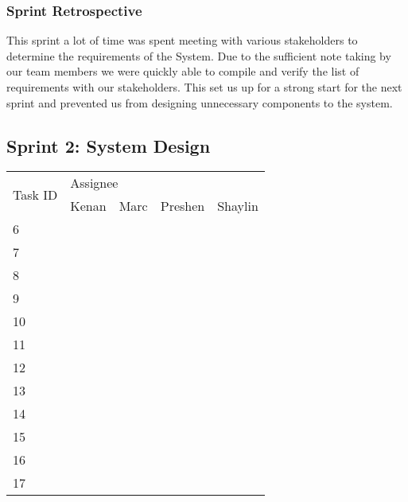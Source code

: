 \documentclass[11pt]{article}
\begin{document}
\subsubsection{Sprint Retrospective}
This sprint a lot of time was spent meeting with various stakeholders to determine the requirements of the System. Due to the sufficient note taking by our team members we were quickly able to compile and verify the list of requirements with our stakeholders. This set us up for a strong start for the next sprint and prevented us from designing unnecessary components to the system.

\subsection{Sprint 2: System Design}

\begin{table}[H]
	\begin{tabular}{@{}|l||l|l|l|l|@{}}
		\toprule
		\multirow{2}{*}{Task ID} & \multicolumn{4}{l|}{Assignee}    \\ \cmidrule(l){2-5} 
	    	& Kenan & Marc & Preshen & Shaylin \\ \midrule
		6	&   \checkmark    &      &        &        \\ \midrule
		7	&       &      &        & \checkmark       \\ \midrule
		8	&   \checkmark    &      &        &        \\ \midrule
		9	&       &  \checkmark    &        &         \\ \midrule
		10	&       &      &        &\checkmark         \\ \midrule
		11	&   \checkmark    &      &  \checkmark      &         \\ \midrule
		12	&    \checkmark   &      &        & \checkmark        \\ \midrule
		13	&    \checkmark   &      &        &\checkmark         \\ \midrule
		14	&    \checkmark   &      & \checkmark       &         \\ \midrule
		15	&      \checkmark &      &        &         \\ \midrule
		16	&     \checkmark  & \checkmark     &\checkmark        &\checkmark         \\ \midrule
		17	&     \checkmark  &      &        &  \checkmark       \\ \bottomrule
	\end{tabular}     
\end{table}
\end{document}
